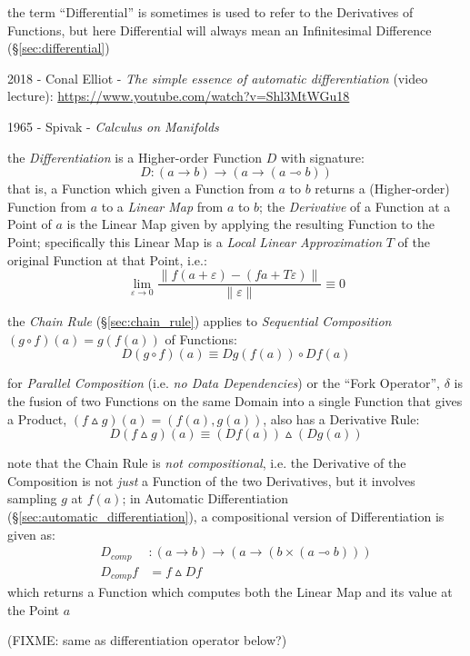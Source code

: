 the term ``Differential'' is sometimes is used to
refer to the Derivatives of Functions, but here Differential will always mean an
Infinitesimal Difference (\S\ref{sec:differential})

2018 - Conal Elliot - \emph{The simple essence of automatic differentiation}
(video lecture): \url{https://www.youtube.com/watch?v=Shl3MtWGu18}

1965 - Spivak - \emph{Calculus on Manifolds}

the \emph{Differentiation} is a Higher-order Function $D$ with signature:
\[
  D : (a \rightarrow b) \rightarrow (a \rightarrow (a \multimap b))
\]
that is, a Function which given a Function from $a$ to $b$ returns a
(Higher-order) Function from $a$ to a \emph{Linear Map} from $a$ to $b$; the
\emph{Derivative} of a Function at a Point of $a$ is the Linear Map given by
applying the resulting Function to the Point; specifically this Linear Map is a
\emph{Local Linear Approximation} $T$ of the original Function at that Point,
i.e.:
\[
  \lim_{\varepsilon \rightarrow 0}
    \frac{\|f (a + \varepsilon) - (f a + T \varepsilon)\|}{\|\varepsilon\|}
    \equiv 0
\]

the \emph{Chain Rule} (\S\ref{sec:chain_rule}) applies to \emph{Sequential
  Composition} $(g \circ f)(a) = g (f (a))$ of Functions:
\[
  D(g \circ f) (a) \equiv D g (f(a)) \circ D f (a)
\]

for \emph{Parallel Composition} (i.e. \emph{no Data Dependencies}) or the ``Fork
Operator'', $\delta$ is the fusion of two Functions on the same Domain into a
single Function that gives a Product, $(f \vartriangle g)(a) = (f(a), g(a))$,
also has a Derivative Rule:
\[
  D(f \vartriangle g)(a) \equiv (D f (a)) \vartriangle (D g (a))
\]

note that the Chain Rule is \emph{not compositional}, i.e. the Derivative of the
Composition is not \emph{just} a Function of the two Derivatives, but it
involves sampling $g$ at $f(a)$; in Automatic Differentiation
(\S\ref{sec:automatic_differentiation}), a compositional version of
Differentiation is given as:
\begin{align*}
  D_{comp}   & : (a \rightarrow b)
    \rightarrow (a \rightarrow (b \times (a \multimap b))) \\
  D_{comp} f & = f \vartriangle D f
\end{align*}
which returns a Function which computes both the Linear Map and its value at the
Point $a$

(FIXME: same as differentiation operator below?)

